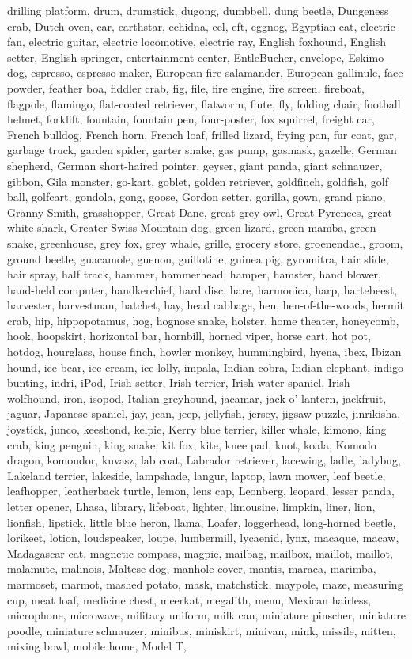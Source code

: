 drilling platform, drum, drumstick, dugong, dumbbell, dung beetle, Dungeness crab, Dutch oven, ear, earthstar, echidna, eel, eft, eggnog, Egyptian cat, electric fan, electric guitar, electric locomotive, electric ray, English foxhound, English setter, English springer, entertainment center, EntleBucher, envelope, Eskimo dog, espresso, espresso maker, European fire salamander, European gallinule, face powder, feather boa, fiddler crab, fig, file, fire engine, fire screen, fireboat, flagpole, flamingo, flat-coated retriever, flatworm, flute, fly, folding chair, football helmet, forklift, fountain, fountain pen, four-poster, fox squirrel, freight car, French bulldog, French horn, French loaf, frilled lizard, frying pan, fur coat, gar, garbage truck, garden spider, garter snake, gas pump, gasmask, gazelle, German shepherd, German short-haired pointer, geyser, giant panda, giant schnauzer, gibbon, Gila monster, go-kart, goblet, golden retriever, goldfinch, goldfish, golf ball, golfcart, gondola, gong, goose, Gordon setter, gorilla, gown, grand piano, Granny Smith, grasshopper, Great Dane, great grey owl, Great Pyrenees, great white shark, Greater Swiss Mountain dog, green lizard, green mamba, green snake, greenhouse, grey fox, grey whale, grille, grocery store, groenendael, groom, ground beetle, guacamole, guenon, guillotine, guinea pig, gyromitra, hair slide, hair spray, half track, hammer, hammerhead, hamper, hamster, hand blower, hand-held computer, handkerchief, hard disc, hare, harmonica, harp, hartebeest, harvester, harvestman, hatchet, hay, head cabbage, hen, hen-of-the-woods, hermit crab, hip, hippopotamus, hog, hognose snake, holster, home theater, honeycomb, hook, hoopskirt, horizontal bar, hornbill, horned viper, horse cart, hot pot, hotdog, hourglass, house finch, howler monkey, hummingbird, hyena, ibex, Ibizan hound, ice bear, ice cream, ice lolly, impala, Indian cobra, Indian elephant, indigo bunting, indri, iPod, Irish setter, Irish terrier, Irish water spaniel, Irish wolfhound, iron, isopod, Italian greyhound, jacamar, jack-o'-lantern, jackfruit, jaguar, Japanese spaniel, jay, jean, jeep, jellyfish, jersey, jigsaw puzzle, jinrikisha, joystick, junco, keeshond, kelpie, Kerry blue terrier, killer whale, kimono, king crab, king penguin, king snake, kit fox, kite, knee pad, knot, koala, Komodo dragon, komondor, kuvasz, lab coat, Labrador retriever, lacewing, ladle, ladybug, Lakeland terrier, lakeside, lampshade, langur, laptop, lawn mower, leaf beetle, leafhopper, leatherback turtle, lemon, lens cap, Leonberg, leopard, lesser panda, letter opener, Lhasa, library, lifeboat, lighter, limousine, limpkin, liner, lion, lionfish, lipstick, little blue heron, llama, Loafer, loggerhead, long-horned beetle, lorikeet, lotion, loudspeaker, loupe, lumbermill, lycaenid, lynx, macaque, macaw, Madagascar cat, magnetic compass, magpie, mailbag, mailbox, maillot, maillot, malamute, malinois, Maltese dog, manhole cover, mantis, maraca, marimba, marmoset, marmot, mashed potato, mask, matchstick, maypole, maze, measuring cup, meat loaf, medicine chest, meerkat, megalith, menu, Mexican hairless, microphone, microwave, military uniform, milk can, miniature pinscher, miniature poodle, miniature schnauzer, minibus, miniskirt, minivan, mink, missile, mitten, mixing bowl, mobile home, Model T, 